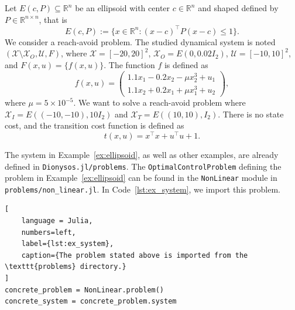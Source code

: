 \documentclass{juliacon}
\begin{document}
\begin{exam}\label{ex:ellipsoid}
Let $E(c, P) \subseteq \mathbb{R}^n$ be an ellipsoid with center $c \in \mathbb{R}^n$ and shaped defined by $P \in \mathbb{R}^{n \times n}$, that is
\begin{equation}
    E(c, P) := \{x \in \mathbb{R}^n : (x-c)^\top P (x-c) \leq 1 \}.
\end{equation} 
We consider a reach-avoid problem. The studied dynamical system is noted $(\mathcal{X} \setminus \mathcal{X}_O, \mathcal{U}, F)$, where $\mathcal{X} = [-20, 20]^2$, $\mathcal{X}_O = E(0, 0.02I_2)$, $\mathcal{U} = [-10, 10]^2$, and $F(x, u) = \{f(x, u)\}$. The function $f$ is defined as 
\begin{equation}
    f(x, u) = \begin{pmatrix}
        1.1x_1 - 0.2x_2 - \mu x_2^3 + u_1 \\
        1.1x_2 + 0.2x_1 + \mu x_1^3 + u_2
    \end{pmatrix}, 
\end{equation}
where $\mu = 5 \times 10^{-5}$. We want to solve a reach-avoid problem where $\mathcal{X}_I = E((-10, -10), 10I_2)$ and $\mathcal{X}_T = E((10, 10), I_2)$. There is no state cost, and the transition cost function is defined as 
\begin{equation}
    t(x, u) = x^\top x + u^\top u + 1.
\end{equation}
\end{exam}

\vskip 6pt

The system in Example~\ref{ex:ellipsoid}, as well as other examples, are already defined in \texttt{Dionysos.jl/problems}. The \texttt{OptimalControlProblem} defining the problem in Example~\ref{ex:ellipsoid} can be found in the \texttt{NonLinear} module in \texttt{problems/non\_linear.jl}. In Code~\ref{lst:ex_system}, we import this problem.
\begin{lstlisting}[
    language = Julia, 
    numbers=left, 
    label={lst:ex_system}, 
    caption={The problem stated above is imported from the \texttt{problems} directory.}
]
concrete_problem = NonLinear.problem()
concrete_system = concrete_problem.system
\end{lstlisting}
\end{document}
